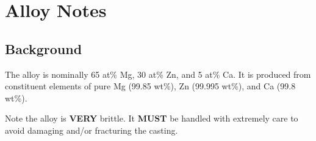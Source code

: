 \section{\MgZnCa Alloy Notes}

\subsection{Background}

The \MgZnCa alloy is nominally 65 at\% Mg, 30 at\% Zn, and 5 at\% Ca. It is produced from constituent elements of pure Mg (99.85 wt\%), Zn (99.995 wt\%), and Ca (99.8 wt\%). 

Note the \MgZnCa alloy is \textbf{VERY} brittle. It \textbf{MUST} be handled with extremely care to avoid damaging and/or fracturing the casting.


